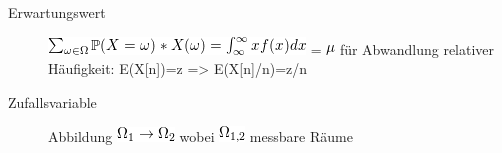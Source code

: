 \documentclass[11pt]{article}
\begin{document}
\begin{description}
\item[Erwartungswert] \includegraphics[width=.9\linewidth]{201301ad-2329314949s0X.png} = \includegraphics[width=.9\linewidth]{201301ad-23333749495-d.png}
                    für Abwandlung relativer Häufigkeit:  E(X[n])=z => E(X[n]/n)=z/n
\item[Zufallsvariable] Abbildung \includegraphics[width=.9\linewidth]{201212ad-1900221184eoW.png} wobei \includegraphics[width=.9\linewidth]{201212ad-1901251184ryc.png} messbare Räume

\end{description}
\end{document}
